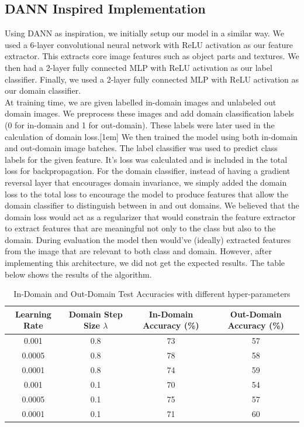 \documentclass[12pt]{article}
\begin{document}
\subsection*{DANN Inspired Implementation}
Using DANN as inspiration, we initially setup our model in a similar way. We used a 6-layer convolutional neural network with ReLU activation as our feature extractor. This extracts core image features such as object parts and textures. We then had a 2-layer fully connected MLP with ReLU activation as our label classifier. Finally, we used a 2-layer fully connected MLP with ReLU activation as our domain classifier. \\[1em]
At training time, we are given labelled in-domain images and unlabeled out domain images. We preprocess these images and add domain classification labels (0 for in-domain and 1 for out-domain). These labels were later used in the calculation of domain loss.[1em]
We then trained the model using both in-domain and out-domain image batches. The label classifier was used to predict class labels for the given feature. It's loss was calculated and is included in the total loss for backpropagation. For the domain classifier, instead of having a gradient reversal layer that encourages domain invariance, we simply added the domain loss to the total loss to encourage the model to produce features that allow the domain classifier to distinguish between in and out domains. We believed that the domain loss would act as a regularizer that would constrain the feature extractor to extract features that are meaningful not only to the class but also to the domain. During evaluation the model then would've (ideally) extracted features from the image that are relevant to both class and domain. However, after implementing this architecture, we did not get the expected results. The table below shows the results of the algorithm. 
\begin{table}[H]
    \centering
    \begin{tabular}{|c|c|c|c|}
      \hline
      Learning Rate & Domain Step Size $\lambda$ & In-Domain Accuracy (\%) & Out-Domain Accuracy (\%)\\
      \hline
      0.001 & 0.8 & 73 & 57\\
      0.0005 & 0.8 & 78 & 58\\
      0.0001 & 0.8 & 74 & 59\\
      0.001 & 0.1 & 70 & 54\\
      0.0005 & 0.1 & 75 & 57\\
      0.0001 & 0.1 & 71 & 60\\
      \hline
    \end{tabular}
    \caption{In-Domain and Out-Domain Test Accuracies with different hyper-parameters}
    \label{tab:in-out-domain-acc}
  \end{table}
\end{document}
